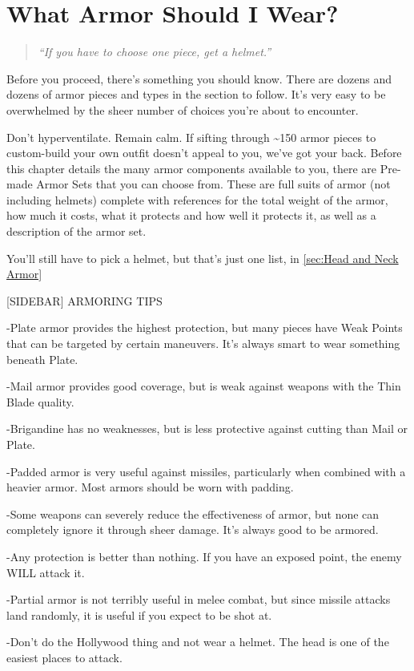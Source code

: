 \documentclass[oneside,11pt,english]{book}
\begin{document}
\section{What Armor Should I Wear?}
\begin{quote}
	\centering
	\emph{“If you have to choose one piece, get a helmet.”}
\end{quote}
Before you proceed, there’s something you should know. There are dozens and dozens of armor pieces and types in 
the section to follow. It’s very easy to be overwhelmed by the sheer number of choices you’re about to encounter. 

Don’t hyperventilate. Remain calm. If sifting through \textasciitilde150 armor pieces to custom-build your own outfit doesn’t
appeal to you, we’ve got your back. Before this chapter details the many armor components available to you, there are
Pre-made Armor Sets that you can choose from. These are full suits of armor (not including helmets) complete with 
references for the total weight of the armor, how much it costs, what it protects and how well it protects it, as well as a description of the armor set.

You’ll still have to pick a helmet, but that’s just one list, in \autoref{sec:Head and Neck Armor}

[SIDEBAR] ARMORING TIPS %

-Plate armor provides the highest protection, but many pieces have Weak Points that can be targeted by certain 
maneuvers. It’s always smart to wear something beneath Plate.

-Mail armor provides good coverage, but is weak against weapons with the Thin Blade quality.

-Brigandine has no weaknesses, but is less protective against cutting than Mail or Plate.

-Padded armor is very useful against missiles, particularly when combined with a heavier armor. Most armors should be worn with padding.

-Some weapons can severely reduce the effectiveness of armor, but none can completely ignore it through sheer 
damage. It’s always good to be armored.

-Any protection is better than nothing. If you have an exposed point, the enemy WILL attack it. 

-Partial armor is not terribly useful in melee combat, but since missile attacks land randomly, it is useful if you expect to be shot at.

-Don’t do the Hollywood thing and not wear a helmet. The head is one of the easiest places to attack.
\end{document}
